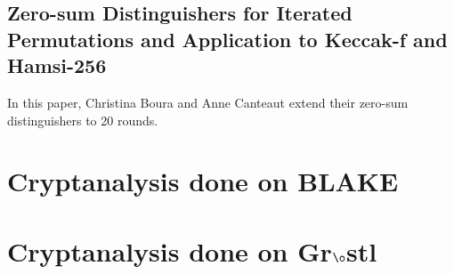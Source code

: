 \subsection{Zero-sum Distinguishers for Iterated Permutations and Application to Keccak-f and Hamsi-256} \cite{00028}
In this paper, Christina Boura and Anne Canteaut extend their zero-sum distinguishers to 20 rounds.

\section{Cryptanalysis done on BLAKE}

\section{Cryptanalysis done on Gr$\o$stl}
